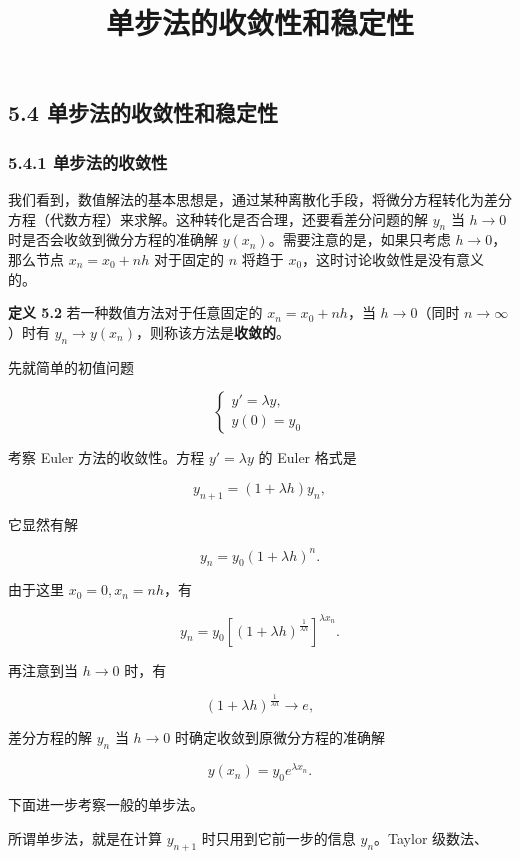 \documentclass[
  10pt,
  fontset=fandol]{ctexart}
\title{单步法的收敛性和稳定性}
\author{}
\date{}
\begin{document}
\maketitle

\subsection{5.4 单步法的收敛性和稳定性}\label{ux5355ux6b65ux6cd5ux7684ux6536ux655bux6027ux548cux7a33ux5b9aux6027}

\subsubsection{5.4.1 单步法的收敛性}\label{ux5355ux6b65ux6cd5ux7684ux6536ux655bux6027}

我们看到，数值解法的基本思想是，通过某种离散化手段，将微分方程转化为差分方程（代数方程）来求解。这种转化是否合理，还要看差分问题的解 \(y_n\) 当 \(h\to0\) 时是否会收敛到微分方程的准确解 \(y(x_n)\)。需要注意的是，如果只考虑 \(h\to0\)，那么节点 \(x_n=x_0+nh\) 对于固定的 \(n\) 将趋于 \(x_0\)，这时讨论收敛性是没有意义的。

\textbf{定义 5.2} 若一种数值方法对于任意固定的 \(x_n=x_0+nh\)，当 \(h\to0\)（同时 \(n\to\infty\)）时有 \(y_n\to y(x_n)\)，则称该方法是\textbf{收敛的}。

先就简单的初值问题

\[
\begin{cases}
y'=\lambda y,\\
y(0)=y_0
\end{cases}\tag{5.4.1}
\]

考察 Euler 方法的收敛性。方程 \(y'=\lambda y\) 的 Euler 格式是

\[
y_{n+1}=(1+\lambda h)y_n,\tag{5.4.2}
\]

它显然有解

\[
y_n=y_0(1+\lambda h)^n.
\]

由于这里 \(x_0=0,x_n=nh\)，有

\[
y_n=y_0\left[(1+\lambda h)^{\frac{1}{\lambda h}}\right]^{\lambda x_n}.
\]

再注意到当 \(h\to0\) 时，有

\[
(1+\lambda h)^{\frac{1}{\lambda h}}\to e,
\]

差分方程的解 \(y_n\) 当 \(h\to0\) 时确定收敛到原微分方程的准确解

\[
y(x_n)=y_0e^{\lambda x_n}.
\]

下面进一步考察一般的单步法。

所谓单步法，就是在计算 \(y_{n+1}\) 时只用到它前一步的信息 \(y_n\)。Taylor 级数法、
\end{document}
